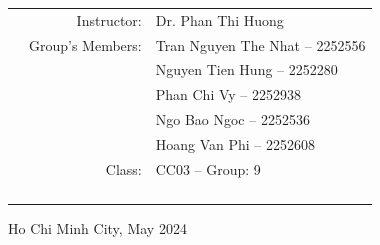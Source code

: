 \documentclass[a4paper]{article}
\theoremstyle{definition}
\begin{document}
\begin{titlepage}
\begin{table}[h]
\begin{tabular}{rrl}
\hspace{3 cm} & Instructor: & Dr. Phan Thi Huong\\
& Group's Members: & Tran Nguyen The Nhat -- 2252556 \\
& & Nguyen Tien Hung -- 2252280 \\
& & Phan Chi Vy -- 2252938 \\
& & Ngo Bao Ngoc -- 2252536 \\
& & Hoang Van Phi -- 2252608 \\
& Class: & CC03 -- Group: 9
\\
\\
\\
\\
\\
\end{tabular}
\end{table}
\vspace{1.5cm}
\begin{center}
{\footnotesize Ho Chi Minh City, May 2024}
\end{center}
\end{titlepage}
\end{document}
